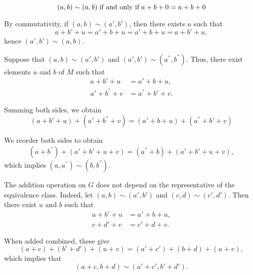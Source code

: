 \begin{defproof}
  \begin{equation*}
    (a, b) \sim (a, b) \T{if and only if} a + b + 0 = a + b + 0
  \end{equation*}

   By commutativity, if \( (a, b) \sim (a', b') \), then there exists \( u \) such that
  \begin{equation*}
    a + b' + u = a' + b + u
    =
    a' + b + u = a + b' + u,
  \end{equation*}
  hence \( (a', b') \sim (a, b) \).

   Suppose that \( (a, b) \sim (a', b') \) and \( (a', b') \sim (a^\dprime, b^\dprime) \). Thus, there exist elements \( u \) and \( b \) of \( M \) such that
  \begin{align*}
    a + b' + u         &= a' + b + u, \\
    a' + b^\dprime + v &= a^\dprime + b' + v.
  \end{align*}

  Summing both sides, we obtain
  \begin{equation*}
    (a + b' + u) + (a' + b^\dprime + v) = (a' + b + u) + (a^\dprime + b' + v)
  \end{equation*}

  We reorder both sides to obtain
  \begin{equation*}
    (a + b^\dprime) + (a' + b' + u + v) = (a^\dprime + b) + (a' + b' + u + v),
  \end{equation*}
  which implies \( (a, a^\dprime) \sim (b, b^\dprime) \).


   The addition operation on \( G \) does not depend on the representative of the equivalence class. Indeed, let \( (a, b) \sim (a', b') \) and \( (c, d) \sim (c', d') \). Then there exist \( u \) and \( b \) such that
  \begin{align*}
    a + b' + u &= a' + b + u, \\
    c + d' + v &= c' + d + v.
  \end{align*}

  When added combined, these give
  \begin{equation*}
    (a + c) + (b' + d') + (u + v)
    =
    (a' + c') + (b + d) + (u + v),
  \end{equation*}
  which implies that
  \begin{equation*}
    (a + c, b + d) \sim (a' + c', b' + d').
  \end{equation*}


\end{defproof}
